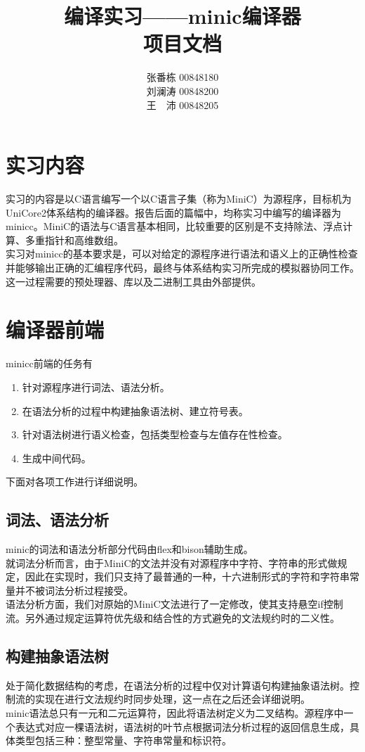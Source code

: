 \documentclass[12pt,a4paper,Flow]{report}
\begin{document}
\title{\textbf{编译实习——minic编译器\\项目文档}}
\author{张番栋 00848180\\刘澜涛 00848200\\王　沛 00848205}
\date{}
\maketitle
\tableofcontents
\newpage
\chapter{实习内容}
实习的内容是以C语言编写一个以C语言子集（称为MiniC）为源程序，目标机为UniCore2体系结构的编译器。报告后面的篇幅中，均称实习中编写的编译器为minicc。MiniC的语法与C语言基本相同，比较重要的区别是不支持除法、浮点计算、多重指针和高维数组。\\
\indent 实习对minicc的基本要求是，可以对给定的源程序进行语法和语义上的正确性检查并能够输出正确的汇编程序代码，最终与体系结构实习所完成的模拟器协同工作。这一过程需要的预处理器、库以及二进制工具由外部提供。
\chapter{编译器前端}
minicc前端的任务有
\begin{enumerate}
\item 针对源程序进行词法、语法分析。
\item 在语法分析的过程中构建抽象语法树、建立符号表。
\item 针对语法树进行语义检查，包括类型检查与左值存在性检查。
\item 生成中间代码。
\end{enumerate}
下面对各项工作进行详细说明。
\newpage
\section{词法、语法分析}
minic的词法和语法分析部分代码由flex和bison辅助生成。\\
\indent 就词法分析而言，由于MiniC的文法并没有对源程序中字符、字符串的形式做规定，因此在实现时，我们只支持了最普通的一种，十六进制形式的字符和字符串常量并不被词法分析过程接受。\\
\indent 语法分析方面，我们对原始的MiniC文法进行了一定修改，使其支持悬空if控制流。另外通过规定运算符优先级和结合性的方式避免的文法规约时的二义性。
\section{构建抽象语法树}
处于简化数据结构的考虑，在语法分析的过程中仅对计算语句构建抽象语法树。控制流的实现在进行文法规约时同步处理，这一点在之后还会详细说明。\\
\indent minic语法总只有一元和二元运算符，因此将语法树定义为二叉结构。源程序中一个表达式对应一棵语法树，语法树的叶节点根据词法分析过程的返回信息生成，具体类型包括三种：整型常量、字符串常量和标识符。
\end{document}
